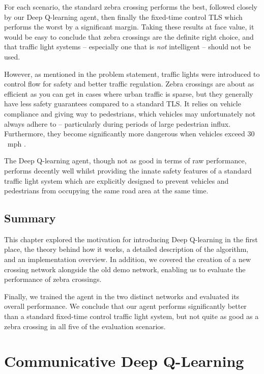 \documentclass[a4paper]{report}
\begin{document}
For each scenario, the standard zebra crossing performs the best, followed closely by our Deep Q-learning agent, then finally the fixed-time control TLS which performs the worst by a significant margin. Taking these results at face value, it would be easy to conclude that zebra crossings are the definite right choice, and that traffic light systems -- especially one that is \emph{not} intelligent -- should not be used.

However, as mentioned in the problem statement, traffic lights were introduced to control flow for safety and better traffic regulation. Zebra crossings are about as efficient as you can get in cases where urban traffic is sparse, but they generally have less safety guarantees compared to a standard TLS. It relies on vehicle compliance and giving way to pedestrians, which vehicles may unfortunately not always adhere to -- particularly during periods of large pedestrian influx. Furthermore, they become significantly more dangerous when vehicles exceed $30$\ mph \cite{ActiveTravel25}.

The Deep Q-learning agent, though not as good in terms of raw performance, performs decently well whilst providing the innate safety features of a standard traffic light system which are explicitly designed to prevent vehicles and pedestrians from occupying the same road area at the same time.

\section{Summary}

This chapter explored the motivation for introducing Deep Q-learning in the first place, the theory behind how it works, a detailed description of the algorithm, and an implementation overview. In addition, we covered the creation of a new crossing network alongside the old demo network, enabling us to evaluate the performance of zebra crossings.

Finally, we trained the agent in the two distinct networks and evaluated its overall performance. We conclude that our agent performs significantly better than a standard fixed-time control traffic light system, but not quite as good as a zebra crossing in all five of the evaluation scenarios.

\chapter{Communicative Deep Q-Learning} \label{chapter:communicative_deep_q_learning}
\end{document}
